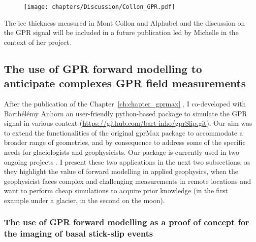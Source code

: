 
\begin{figure}[h]
    \centering
    \texttt{[image: chapters/Discussion/Collon\_GPR.pdf]}
    \caption{ }
    \label{fig:collon_GPR}
\end{figure}



The ice thickness measured in Mont Collon and Alphubel and the discussion on the GPR signal will be included in a future publication led by Michelle in the context of her project. 

\subsection{The use of GPR forward modelling to anticipate complexes GPR field measurements}

After the publication of the Chapter~\ref{ch:chapter_gprmax} \citep{Ogier&al2023}, I co-developed with Barthélémy Anhorn an user-friendly python-based package to simulate the GPR signal in various context (\url{https://github.com/bart-inho/gprSlip.git}). Our aim was to extend the functionalities of the original gprMax package \citep{Warren&al2016} to accommodate a broader range of geometries, and by consequence to address some of the specific needs for glaciologists and geophysicists. Our package is currently used in two ongoing projects \citep{Aichele&al2024,Mittelholz&al2024}. I present these two applications in the next two subsections, as they highlight the value of forward modelling in applied geophysics, when the geophysicist faces complex and challenging measurements in remote locations and want to perform cheap simulations to acquire prior knowledge (in the first example under a glacier, in the second on the moon). 

\subsubsection{The use of GPR forward modelling as a proof of concept for the imaging of basal stick-slip events}
 
